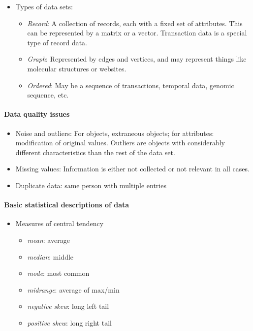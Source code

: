\documentclass[11pt]{article}
\providecommand{\tightlist}{%
      \setlength{\itemsep}{0pt}\setlength{\parskip}{0pt}}
\begin{document}
    \begin{itemize}
\tightlist
\item
  Types of data sets:

  \begin{itemize}
  \tightlist
  \item
    \emph{Record}: A collection of records, each with a fixed set of
    attributes. This can be represented by a matrix or a vector.
    Transaction data is a special type of record data.
  \item
    \emph{Graph}: Represented by edges and vertices, and may represent
    things like molecular structures or websites.
  \item
    \emph{Ordered}: May be a sequence of transactions, temporal data,
    genomic sequence, etc.
  \end{itemize}
\end{itemize}

    \paragraph{Data quality issues}\label{data-quality-issues}

    \begin{itemize}
\tightlist
\item
  Noise and outliers: For objects, extraneous objects; for attributes:
  modification of original values. Outliers are objects with
  considerably different characteristics than the rest of the data set.
\item
  Missing values: Information is either not collected or not relevant in
  all cases.
\item
  Duplicate data: same person with multiple entries
\end{itemize}

    \paragraph{Basic statistical descriptions of
data}\label{basic-statistical-descriptions-of-data}

    \begin{itemize}
\tightlist
\item
  Measures of central tendency

  \begin{itemize}
  \tightlist
  \item
    \emph{mean}: average
  \item
    \emph{median}: middle
  \item
    \emph{mode}: most common
  \item
    \emph{midrange}: average of max/min
  \item
    \emph{negative skew}: long left tail
  \item
    \emph{positive skew}: long right tail
  \end{itemize}
\end{itemize}
\end{document}
